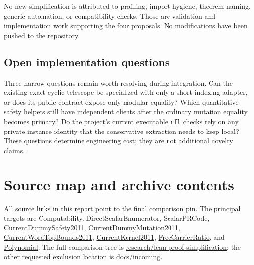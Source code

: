 \documentclass[11pt,a4paper]{article}
\newcommand{\code}[1]{\texttt{\small #1}}
\newcommand{\repo}{https://github.com/VladimirReshetnikov/ProveIt}
\newcommand{\pin}{60fcb2a69b7f1fdd4c3592ea5f164223cad50abe}
\newcommand{\src}[2]{\href{\repo/blob/\pin/Computability/DiophantineConsistency/Lean/DiophantineConsistency/#1.lean}{#2}}
\begin{document}
No new simplification is attributed to profiling, import hygiene, theorem naming, generic automation, or compatibility checks. Those are validation and implementation work supporting the four proposals. No modifications have been pushed to the repository.

\subsection{Open implementation questions}

Three narrow questions remain worth resolving during integration. Can the existing exact cyclic telescope be specialized with only a short indexing adapter, or does its public contract expose only modular equality? Which quantitative safety helpers still have independent clients after the ordinary mutation equality becomes primary? Do the project's current executable \code{rfl} checks rely on any private instance identity that the conservative extraction needs to keep local? These questions determine engineering cost; they are not additional novelty claims.

\section*{Source map and archive contents}

All source links in this report point to the final comparison pin. The principal targets are \src{Computability}{Computability}, \src{DirectScalarEnumerator}{DirectScalarEnumerator}, \src{ScalarPRCode}{ScalarPRCode}, \src{CurrentDummySafety2011}{CurrentDummySafety2011}, \src{CurrentDummyMutation2011}{CurrentDummyMutation2011}, \src{CurrentWordTopBounds2011}{CurrentWordTopBounds2011}, \src{CurrentKernel2011}{CurrentKernel2011}, \src{FreeCarrierRatio}{FreeCarrierRatio}, and \src{Polynomial}{Polynomial}. The full comparison tree is \href{\repo/tree/\pin/Computability/DiophantineConsistency/research/lean-proof-simplification}{research/lean-proof-simplification}; the other requested exclusion location is \href{\repo/tree/\pin/docs/incoming}{docs/incoming}.
\end{document}
